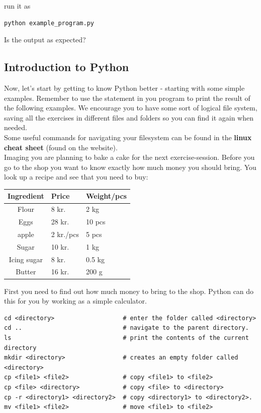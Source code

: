 \documentclass{article}
\begin{document}
run it as

\begin{lstlisting}
python example_program.py
\end{lstlisting}

Is the output as expected? 

\subsection{Introduction to Python}

Now, let's start by getting to know Python better - starting with some simple examples. Remember to use the  statement in you program to print the result of the following examples. We encourage you to have some sort of logical file system, saving all the exercises in
different files and folders so you can find it again when needed. \\

Some useful commands for navigating your filesystem can be found in the \textbf{linux cheat sheet} (found on the website). \\

Imaging you are planning to bake a cake for the next exercise-session. Before you go to the shop you want to know exactly how much money you should bring. You look up a recipe and see that you need to buy:

\vspace{10pt }
 
\begin{center}
\begin{tabular}{c l l}
\hline
Ingredient & Price & Weight/pcs \\
\hline
Flour & 8 kr. & 2 kg \\
Eggs & 28 kr. & 10 pcs \\
apple & 2 kr./pcs & 5 pcs \\
Sugar & 10 kr. & 1 kg \\
Icing sugar &  8 kr. & 0.5 kg \\
Butter & 16 kr. & 200 g \\
\end{tabular}
\end{center}

First you need to find out how much money to bring to the shop. Python can do this for you by working as a simple calculator.




\iffalse
\begin{lstlisting}
cd <directory>                   # enter the folder called <directory>
cd ..                            # navigate to the parent directory.
ls                               # print the contents of the current directory
mkdir <directory>                # creates an empty folder called <directory>
cp <file1> <file2>               # copy <file1> to <file2>
cp <file> <directory>            # copy <file> to <directory>
cp -r <directory1> <directory2>  # copy <directory1> to <directory2>.
mv <file1> <file2>               # move <file1> to <file2>
\end{lstlisting}
\end{document}
